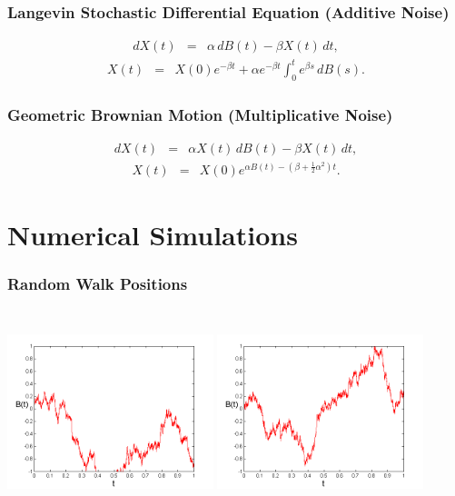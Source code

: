\documentclass{beamer}   %
\begin{document}
\begin{frame}
    \frametitle{Langevin Stochastic Differential Equation (Additive Noise)}
	\begin{eqnarray*}
		dX(t) &=& \alpha\,dB(t)-\beta X(t)\,dt,		
	\end{eqnarray*}
	\begin{eqnarray*}
		X(t)&=& X(0) e^{- \beta t} + \alpha e^{- \beta t} \int^t_0 e^{\beta s} \, dB(s).
	\end{eqnarray*}
\end{frame}


\begin{frame}
    \frametitle{Geometric Brownian Motion (Multiplicative Noise)}
	\begin{eqnarray*}
		dX(t) &=& \alpha X(t) \, dB(t)-\beta X(t) \, dt, 
	\end{eqnarray*}
	\begin{eqnarray*}
		X(t) &=& X(0)e^{\alpha B(t) - (\beta + \frac{1}{2} \alpha^{2})t}.			
	\end{eqnarray*}

\end{frame}







\section{Numerical Simulations}
\begin{frame}
    \frametitle{Random Walk Positions}
    \hspace{-7mm}
    \vspace{4mm}
\includegraphics[height=6cm,width=6cm]{rw1}
\includegraphics[height=6cm,width=6cm]{rw2}
\end{frame}
\end{document}
